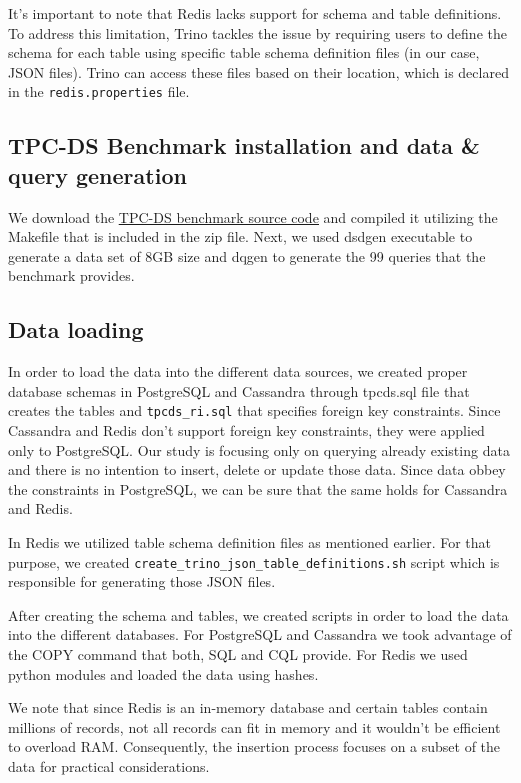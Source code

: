 \documentclass[conference]{IEEEtran}
\begin{document}
It's important to note that Redis lacks support for schema and table definitions. To address this limitation, Trino tackles the issue by requiring users to
define the schema for each table using specific table schema definition files (in our case, JSON files). Trino can access these files based on their location, which is declared in the \texttt{redis.properties} file.

\subsection{TPC-DS Benchmark installation and data \& query generation}

We download the \textcolor{linkblue}{\underline{\href{https://www.tpc.org/tpc_documents_current_versions/current_specifications5.asp}{TPC-DS benchmark source code}}} and compiled it
utilizing the Makefile that is included in the zip file. Next, we used dsdgen executable to generate a data set of 8GB size and dqgen to generate the 99 queries that the benchmark provides.

\subsection{Data loading}

In order to load the data into the different data sources, we created proper database schemas in PostgreSQL and Cassandra through
tpcds.sql file that creates the tables and \texttt{tpcds\_ri.sql} that specifies foreign key constraints. Since Cassandra and Redis don't support foreign key constraints, they were applied only to PostgreSQL. Our
study is focusing only on querying already existing data and there is no intention to insert, delete or update those data. Since data obbey the constraints in PostgreSQL, we can be sure that the same holds
for Cassandra and Redis.

In Redis we utilized table schema definition files as mentioned earlier. For that purpose, we created \texttt{create\_trino\_json\_table\_definitions.sh} script which is responsible for generating those JSON files.

After creating the schema and tables, we created scripts in order to load the data into the different databases. For PostgreSQL and Cassandra we took advantage of the COPY command that both, SQL and CQL provide.
For Redis we used python modules and loaded the data using hashes.

We note that since Redis is an in-memory database and certain tables contain millions of records, not all records can fit in memory and it wouldn't be efficient to overload RAM. Consequently, the insertion process
focuses on a subset of the data for practical considerations.
\end{document}
